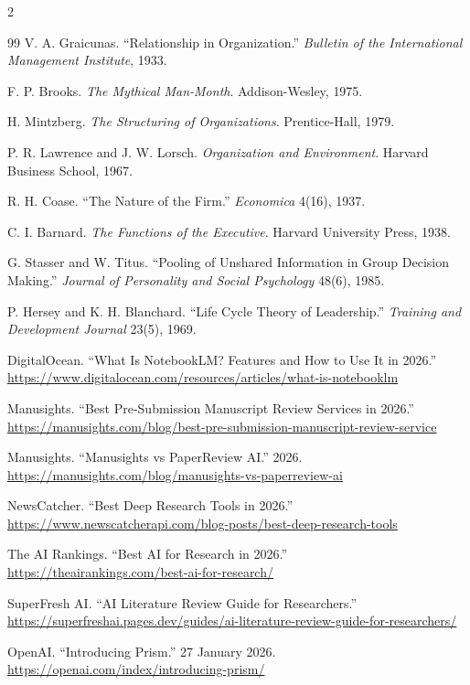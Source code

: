 \documentclass[11pt,letterpaper]{article}
\begin{document}
\begin{multicols}{2}
{\begin{thebibliography}{99}
 V. A. Graicunas. ``Relationship in Organization.'' \emph{Bulletin of
the International Management Institute}, 1933.

 F. P. Brooks. \emph{The Mythical Man-Month}. Addison-Wesley, 1975.

 H. Mintzberg. \emph{The Structuring of Organizations}. Prentice-Hall,
1979.

 P. R. Lawrence and J. W. Lorsch. \emph{Organization and Environment}.
Harvard Business School, 1967.

 R. H. Coase. ``The Nature of the Firm.'' \emph{Economica} 4(16), 1937.

 C. I. Barnard. \emph{The Functions of the Executive}. Harvard University
Press, 1938.

 G. Stasser and W. Titus. ``Pooling of Unshared Information in Group
Decision Making.'' \emph{Journal of Personality and Social Psychology} 48(6), 1985.

 P. Hersey and K. H. Blanchard. ``Life Cycle Theory of Leadership.''
\emph{Training and Development Journal} 23(5), 1969.

 DigitalOcean. ``What Is NotebookLM? Features and How to Use It in 2026.''
\url{https://www.digitalocean.com/resources/articles/what-is-notebooklm}

 Manusights. ``Best Pre-Submission Manuscript Review Services in 2026.''
\url{https://manusights.com/blog/best-pre-submission-manuscript-review-service}

 Manusights. ``Manusights vs PaperReview AI.'' 2026.
\url{https://manusights.com/blog/manusights-vs-paperreview-ai}

 NewsCatcher. ``Best Deep Research Tools in 2026.''
\url{https://www.newscatcherapi.com/blog-posts/best-deep-research-tools}

 The AI Rankings. ``Best AI for Research in 2026.''
\url{https://theairankings.com/best-ai-for-research/}

 SuperFresh AI. ``AI Literature Review Guide for Researchers.''
\url{https://superfreshai.pages.dev/guides/ai-literature-review-guide-for-researchers/}

 OpenAI. ``Introducing Prism.'' 27 January 2026.
\url{https://openai.com/index/introducing-prism/}

\end{thebibliography}}
\end{multicols}
\end{document}
